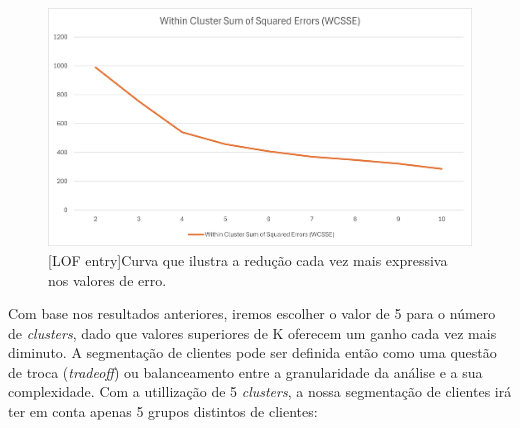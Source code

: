\documentclass{easychair}
\begin{document}
\begin{figure}[H]
    \begin{centering}
    \includegraphics[width=1\linewidth]{imagens/figure16.jpg}\label{cap-3-fig16}
    [LOF entry]{Curva que ilustra a redução cada vez mais expressiva nos valores de erro.}
    \label{fig16}
    \end{centering}
\end{figure}


\newpage
Com base nos resultados anteriores, iremos escolher o valor de 5 para o número de \textit{clusters}, dado que valores superiores de K oferecem um ganho cada vez mais diminuto.
A segmentação de clientes pode ser definida então como uma questão de troca (\textit{tradeoff}) ou balanceamento entre a granularidade da análise e a sua complexidade. Com a utillização de 5 \textit{clusters}, a nossa segmentação de clientes irá ter em conta apenas 5 grupos distintos de clientes:
\end{document}
